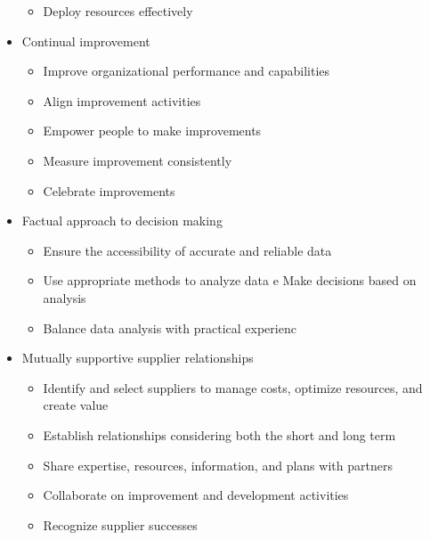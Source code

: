 \documentclass{article}
\begin{document}
\begin{itemize}
\begin{itemize}
    \item Deploy resources effectively
  \end{itemize}
  \item Continual improvement
  \begin{itemize}
    \item Improve organizational performance and capabilities
    \item Align improvement activities
    \item Empower people to make improvements
    \item Measure improvement consistently
    \item Celebrate improvements
  \end{itemize}  
  \item Factual approach to decision making
  \begin{itemize}
    \item Ensure the accessibility of accurate and reliable data
    \item Use appropriate methods to analyze data
    e Make decisions based on analysis
    \item Balance data analysis with practical experienc
  \end{itemize}  
  \item Mutually supportive supplier relationships
  \begin{itemize}
    \item Identify and select suppliers to manage costs, optimize resources, and create value
    \item Establish relationships considering both the short and long term
    \item Share expertise, resources, information, and plans with partners
    \item Collaborate on improvement and development activities
    \item Recognize supplier successes
  \end{itemize}
\end{itemize}
\end{document}
